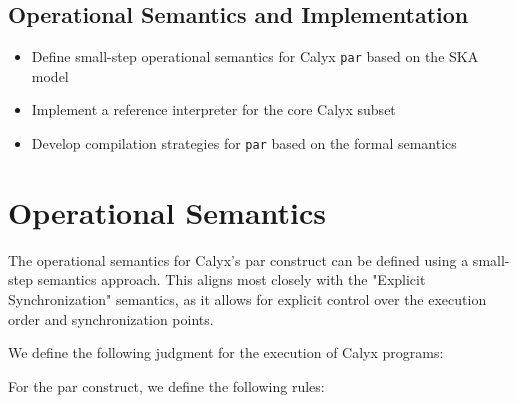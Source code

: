 \documentclass[sigplan,10pt,authorversion,nonacm]{acmart}
\theoremstyle{remark}
\begin{document}
\subsection{Operational Semantics and Implementation}
\begin{itemize}
    \item Define small-step operational semantics for Calyx \texttt{par} based on the SKA model
    \item Implement a reference interpreter for the core Calyx subset
    \item Develop compilation strategies for \texttt{par} based on the formal semantics
\end{itemize}

\section{Operational Semantics}

The operational semantics for Calyx's par construct can be defined using a small-step semantics approach. This aligns most closely with the "Explicit Synchronization" semantics, as it allows for explicit control over the execution order and synchronization points.

We define the following judgment for the execution of Calyx programs:

\begin{mathpar}
\end{mathpar}

For the par construct, we define the following rules:

\begin{mathpar}


\end{mathpar}
\end{document}
